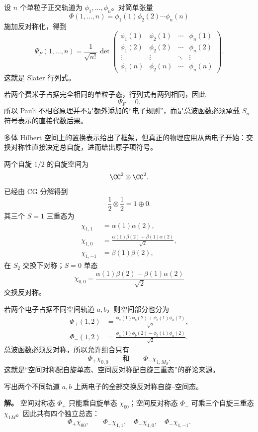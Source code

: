 设 $n$ 个单粒子正交轨道为 $\phi_1,\dots,\phi_n$。对简单张量
\[
\Phi(1,\dots,n)=\phi_1(1)\phi_2(2)\cdots\phi_n(n)
\]
施加反对称化，得到
\begin{equation}
\Psi_F(1,\dots,n)
=\frac1{\sqrt{n!}}
\det\!\begin{pmatrix}
\phi_1(1)&\phi_2(1)&\cdots&\phi_n(1)\\
\phi_1(2)&\phi_2(2)&\cdots&\phi_n(2)\\
\vdots&\vdots&\ddots&\vdots\\
\phi_1(n)&\phi_2(n)&\cdots&\phi_n(n)
\end{pmatrix}.
\label{eq:slater-determinant}
\end{equation}
这就是 Slater 行列式。

若两个费米子占据完全相同的单粒子态，行列式有两列相同，因此
\[
\Psi_F=0.
\]
所以 Pauli 不相容原理并不是额外添加的“电子规则”，而是总波函数必须承载 $S_n$ 符号表示的直接代数后果。

多体 Hilbert 空间上的置换表示给出了框架，但真正的物理应用从两电子开始：交换对称性直接决定总自旋，进而给出原子项符号。

两个自旋 $1/2$ 的自旋空间为
\[
\CC^2\otimes\CC^2.
\]
已经由 CG 分解得到
\[
\frac12\otimes\frac12=1\oplus0.
\]
其三个 $S=1$ 三重态为
\begin{align*}
\chi_{1,1}&=\alpha(1)\alpha(2),\\
\chi_{1,0}&=\frac{\alpha(1)\beta(2)+\beta(1)\alpha(2)}{\sqrt2},\\
\chi_{1,-1}&=\beta(1)\beta(2),
\end{align*}
在 $S_2$ 交换下对称；$S=0$ 单态
\[
\chi_{0,0}
=\frac{\alpha(1)\beta(2)-\beta(1)\alpha(2)}{\sqrt2}
\]
交换反对称。

若两个电子占据不同空间轨道 $a,b$，则空间部分也分为
\begin{align*}
\Phi_+(1,2)
&=\frac{\phi_a(1)\phi_b(2)+\phi_b(1)\phi_a(2)}{\sqrt2},\\
\Phi_-(1,2)
&=\frac{\phi_a(1)\phi_b(2)-\phi_b(1)\phi_a(2)}{\sqrt2}.
\end{align*}
总波函数必须反对称，所以允许组合只有
\[
\Phi_+\chi_{0,0}
\qquad\text{和}\qquad
\Phi_-\chi_{1,M_S}.
\]
这就是“空间对称配自旋单态、空间反对称配自旋三重态”的群论来源。

\begin{workedexample}
写出两个不同轨道 $a,b$ 上两电子的全部交换反对称自旋--空间态。

\textbf{解。} 空间对称态 $\Phi_+$ 只能乘自旋单态 $\chi_{00}$；空间反对称态 $\Phi_-$ 可乘三个自旋三重态 $\chi_{1M}$。因此共有四个独立总态：
\[
\Phi_+\chi_{00},
\qquad
\Phi_-\chi_{1,1},
\quad
\Phi_-\chi_{1,0},
\quad
\Phi_-\chi_{1,-1}.
\]
\end{workedexample}


